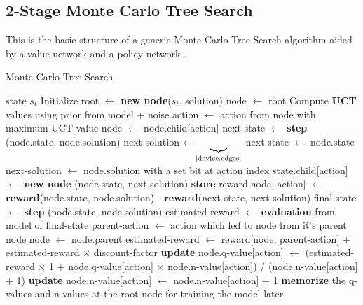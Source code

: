 \documentclass[%
 reprint,
 amsmath,amssymb,
 aps,
]{revtex4-2}
\begin{document}
\subsection{\label{sec:method-mcts}2-Stage Monte Carlo Tree Search}

This is the basic structure of a generic Monte Carlo Tree Search algorithm aided by a value network and a policy network \citep{mcts_alphago}.

\begin{algorithm}[H]
    \caption{Monte Carlo Tree Search}
    \label{algmcts}
    \begin{algorithmic}
         state $s_t$
        \STATE Initialize root $\leftarrow$ \textbf{new node}($s_t$, solution)
        \LOOP
            \STATE node $\gets$ root
            \REPEAT
            \STATE Compute \textbf{UCT} values using prior from model + noise
            \STATE action $\gets$ action from node with maximum UCT value
                \STATE node $\gets$ node.child[action]
            \ELSE
                    \STATE next-state $\gets$ \textbf{step} (node.state, node.solution)
                    \STATE {}
                    next-solution $\leftarrow \underbrace{\vrule width0pt depth \dimexpr\dp0 + .3ex\relax\copy0}_{\textrm{\text{|device.edges|}}}$
                \ELSE
                    \STATE next-state $\gets$ node.state
                    \STATE next-solution $\gets$ node.solution with a set bit at action index
                \ENDIF
                \STATE state.child[action] $\gets$ \textbf{new node} (node.state, next-solution)
                \STATE \textbf{store} reward[node, action] $\gets$ \textbf{reward}(node.state, node.solution) - \textbf{reward}(next-state, next-solution)
            \ENDIF
            \STATE final-state $\gets$ \textbf{step} (node.state, node.solution)
            \STATE estimated-reward $\gets$ \textbf{evaluation} from model of final-state
                \STATE parent-action $\gets$ action which led to node from it's parent node
                \STATE node $\gets$ node.parent
                \STATE estimated-reward $\gets$ reward[node, parent-action] + estimated-reward $\times$ discount-factor
                \STATE \textbf{update} node.q-value[action] $\gets$ (estimated-reward $\times$ 1 + node.q-value[action] $\times$ node.n-value[action]) / (node.n-value[action] + 1)
                \STATE \textbf{update} node.n-value[action] $\gets$ node.n-value[action] + 1
            \ENDWHILE
        \ENDLOOP
        \STATE \textbf{memorize} the q-values and n-values at the root node for training the model later

    \end{algorithmic}
\end{algorithm}

\nocite{*}

\end{document}
